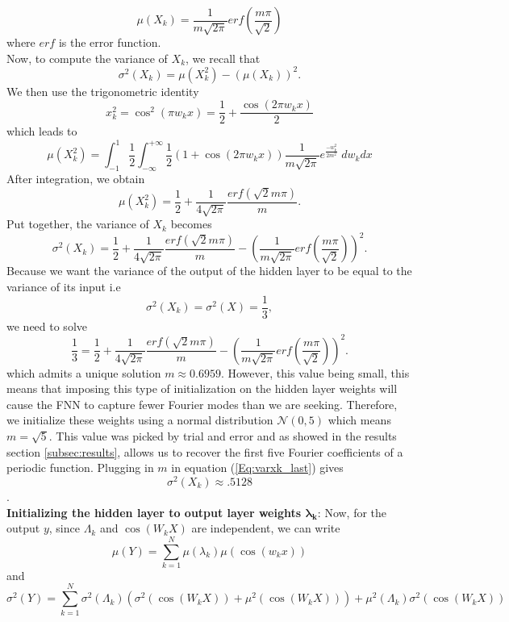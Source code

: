 \documentclass[AMS,STIX1COL]{WileyNJD-v2}
\begin{document}
\begin{equation}\label{Eq:muxk_last}
    \mu(X_k) = \frac{1}{m\sqrt{2\pi}}erf\left(\frac{m\pi}{\sqrt{2}}\right) 
\end{equation}
where $erf$ is the error function.\\
Now, to compute the variance of $X_k$, we recall that
$$\sigma^2(X_k) = \mu(X_k^2) - (\mu(X_k))^2.$$ 
We then use the trigonometric identity $$x_k^2 = \cos^2(\pi w_k x) = \frac{1}{2} + \frac{\cos(2\pi w_kx)}{2}$$ which leads to
\begin{equation*}
    \mu(X_k^2) = \int_{-1}^{1}\frac{1}{2} \int_{-\infty}^{+\infty} \frac{1}{2}(1 + \cos(2 \pi w_k x))\frac{1}{m \sqrt{2\pi}} e^{\frac{-w_k^2}{2m^2}}\; dw_k dx
\end{equation*}
After integration, we obtain 
$$\mu(X_k^2) = \frac{1}{2} + \frac{1}{4\sqrt{2\pi}}\frac{erf\left(\sqrt{2}m\pi\right)}{m}.$$
Put together, the variance of $X_k$ becomes
\begin{equation}\label{Eq:varxk_last}
    \sigma^2(X_k) = \frac{1}{2} + \frac{1}{4\sqrt{2\pi}}\frac{erf(\sqrt{2}m\pi)}{m}-\left(\frac{1}{m\sqrt{2\pi}}erf\left(\frac{m\pi}{\sqrt{2}}\right) \right)^2 .
\end{equation}
Because we want the variance of the output of the hidden layer to be equal to the variance of its input i.e $$\sigma^2(X_k) = \sigma^2(X) = \frac{1}{3}, $$ we need to solve 
\begin{equation*}
    \frac{1}{3} = \frac{1}{2} + \frac{1}{4\sqrt{2\pi}}\frac{erf(\sqrt{2}m\pi)}{m}-\left(\frac{1}{m\sqrt{2\pi}}erf\left(\frac{m\pi}{\sqrt{2}}\right) \right)^2 .
\end{equation*}
which admits a unique solution $m \approx 0.6959$. However, this value being small, this means that imposing this type of initialization on the hidden layer weights will cause the FNN to capture fewer Fourier modes than we are seeking. Therefore, we initialize these weights using a normal distribution $\mathcal N(0,5)$ which means $m = \sqrt{5}$. This value was picked by trial and error and as showed in the results section \ref{subsec:results}, allows us to recover the first five Fourier coefficients of a periodic function. Plugging in $m$ in equation (\ref{Eq:varxk_last}) gives
$$\sigma^2(X_k) \approx .5128$$. \\
 \textbf{Initializing the hidden layer to output layer weights  $\mathbf{\lambda_k}$}: Now, for the output $y$, since $\Lambda_k$ and $\cos(W_k X)$ are independent, we can write $$\mu(Y) = \sum_{k = 1}^N \mu(\lambda_k) \mu(\cos(w_k x  ))$$ and $$\sigma^2(Y) = \sum_{k = 1}^N \sigma^2 (\Lambda_k)  \left(\sigma^2\left(\cos(W_k X)\right)+\mu^2\left(\cos(W_k X)\right) \right) +  \mu^2(\Lambda_k)\sigma^2\left(\cos(W_k X)\right)$$ 
\end{document}
